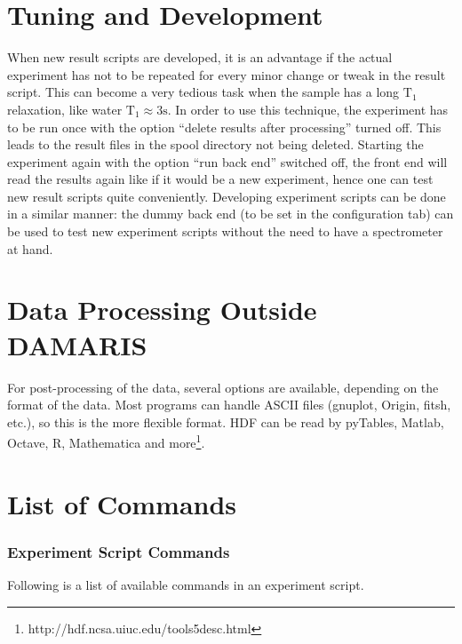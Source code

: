 \documentclass[12pt, a4paper, BCOR10mm, twoside, titlepage, headinclude]{scrbook}
\begin{document}
\section{Tuning and Development}
\label{tuning}
When new result scripts are developed, it is an advantage if the actual experiment has not to be repeated for every minor change or tweak in the result script. This can become a very tedious task when the sample has a long $\textrm{T}_{1}$ relaxation, like water $\textrm{T}_{1} \approx 3\textrm{s}$\citep{PhysRev.111.1201}. 
In order to use this technique, the experiment has to be run once with the option ``delete results after processing'' turned off. This leads to the result files in the spool directory not being deleted. Starting the experiment again with the option ``run back end'' switched off, the front end will read the results again like if it would be a new experiment, hence one can test new result scripts quite conveniently.
Developing experiment scripts can be done in a similar manner: the dummy back end  (to be set in the configuration tab) can be used to test new experiment scripts without the need to have a spectrometer at hand.
\section{Data Processing Outside \textsf{DAMARIS}}
For post-processing of the data, several options are available, depending on the format of the data. Most programs can handle \textsf{ASCII} files (\textsf{gnuplot}, \textsf{Origin}, fitsh, etc.), so this is the more flexible format. \textsf{HDF} can be read by \textsf{pyTables}, \textsf{Matlab}, \textsf{Octave}, \textsf{R}, \textsf{Mathematica} and more\footnote{http://hdf.ncsa.uiuc.edu/tools5desc.html}.



\section{List of Commands}
\subsubsection{Experiment Script Commands}
Following is a list of available commands in an experiment script.
\end{document}
